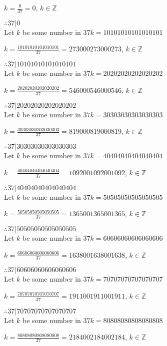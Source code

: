 \documentclass{article}
\begin{document}
$k = \frac{0}{37} = 0$, $k \in \mathbb{Z}$

$ \therefore  37|0 $ \\

Let $k$ be some number in $37k = 10101010101010101$

$k = \frac{10101010101010101}{37} = 273000273000273$, $k \in \mathbb{Z}$

$ \therefore  37|10101010101010101 $ \\

Let $k$ be some number in $37k = 20202020202020202$

$k = \frac{20202020202020202}{37} = 546000546000546$, $k \in \mathbb{Z}$

$ \therefore  37|20202020202020202 $ \\

Let $k$ be some number in $37k = 30303030303030303$

$k = \frac{30303030303030303}{37} = 819000819000819$, $k \in \mathbb{Z}$

$ \therefore  37|30303030303030303 $ \\

Let $k$ be some number in $37k = 40404040404040404$

$k = \frac{40404040404040404}{37} = 1092001092001092$, $k \in \mathbb{Z}$

$ \therefore  37|40404040404040404 $ \\

Let $k$ be some number in $37k = 50505050505050505$

$k = \frac{50505050505050505}{37} = 1365001365001365$, $k \in \mathbb{Z}$

$ \therefore  37|50505050505050505 $ \\

Let $k$ be some number in $37k = 60606060606060606$

$k = \frac{60606060606060606}{37} = 1638001638001638$, $k \in \mathbb{Z}$

$ \therefore  37|60606060606060606 $ \\

Let $k$ be some number in $37k = 70707070707070707$

$k = \frac{70707070707070707}{37} = 1911001911001911$, $k \in \mathbb{Z}$

$ \therefore  37|70707070707070707 $ \\

Let $k$ be some number in $37k = 80808080808080808$

$k = \frac{80808080808080808}{37} = 2184002184002184$, $k \in \mathbb{Z}$
\end{document}
